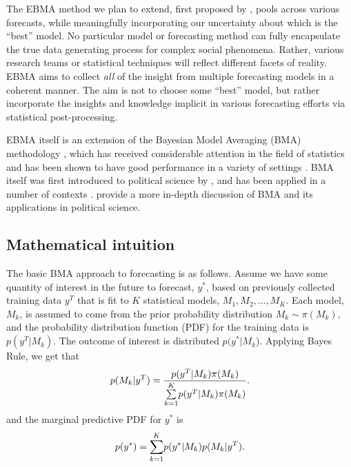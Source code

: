 \documentclass[pdftex,12pt,fullpage,oneside]{amsart}
\begin{document}
The EBMA method we plan to extend, first proposed by
\citet{Raftery:2005}, pools across various forecasts, while
meaningfully incorporating our uncertainty about which is the ``best''
model.  No particular model or forecasting method can fully
encapsulate the true data generating process for complex social
phenomena.  Rather, various research teams or statistical techniques
will reflect different facets of reality. EBMA aims to collect
\textit{all} of the insight from multiple forecasting models in a
coherent manner.  The aim is not to choose some ``best'' model, but
rather incorporate the insights and knowledge implicit in various
forecasting efforts via statistical post-processing.

EBMA itself is an extension of the Bayesian Model Averaging (BMA)
methodology \citep[c.f.,][]{Madigan:1994, Draper:1995, Raftery:1995,
  Hoeting:1999, Clyde:2003, Clyde:2004}, which has received
considerable attention in the field of statistics and has been shown
to have good performance in a variety of settings
\citep{Raftery:2003}. BMA itself was first introduced to political
science by \citet{Bartels:1997}, and has been applied in a number of
contexts \citep[e.g.,][]{Bartels:2001, Gill:2004, Imai:2004,
  Geer:2006b}. \citet{Montgomery:2010c} provide a more in-depth
discussion of BMA and its applications in political science.

\subsection{Mathematical intuition}
The basic BMA approach to forecasting is as follows. Assume we have
some quantity of interest in the future to forecast, $y^*$, based on
previously collected training data $y^T$ that is fit to $K$
statistical models, $M_1, M_2, \ldots, M_K$. Each model, $M_k$, is
assumed to come from the prior probability distribution $M_k\sim
\pi(M_k)$, and the probability distribution function (PDF) for the
training data is $p(y^T|M_k)$. The outcome of interest is distributed
$p(y^*|M_k$).  Applying Bayes Rule, we get that
\begin{equation} \small
p(M_k|y^T) = \frac{p(y^T|M_k)\pi(M_k)}{\underset{k=1}{\overset{K}{\sum}}p(y^T|M_k)\pi(M_k)}.
\end{equation}
\noindent and the marginal predictive PDF for $y^*$ is
\begin{equation}
\label{BMA-pdf}
\small
p(y^*) = \underset{k=1}{\overset{K}{\sum}} p(y^*|M_k)p(M_k|y^T).
\end{equation}
\end{document}

